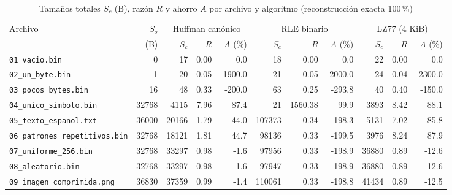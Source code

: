 \begin{table}[H]\centering\scriptsize
\caption{Tamaños totales $S_c$ (B), razón $R$ y ahorro $A$ por archivo y algoritmo (reconstrucción exacta 100\,\%)}\label{tab:tamanos}
\begin{tabular}{@{}lrrrrrrrrrr@{}}\toprule
Archivo & $S_o$ & \multicolumn{3}{c}{Huffman canónico} & \multicolumn{3}{c}{RLE binario} & \multicolumn{3}{c}{LZ77 (4 KiB)} \\
\cmidrule(lr){3-5}\cmidrule(lr){6-8}\cmidrule(l){9-11}
 & (B) & $S_c$ & $R$ & $A$ (\%) & $S_c$ & $R$ & $A$ (\%) & $S_c$ & $R$ & $A$ (\%) \\ \midrule
\texttt{01\_vacio.bin} & 0 & 17 & 0.00 & 0.0 & 18 & 0.00 & 0.0 & 22 & 0.00 & 0.0 \\
\texttt{02\_un\_byte.bin} & 1 & 20 & 0.05 & -1900.0 & 21 & 0.05 & -2000.0 & 24 & 0.04 & -2300.0 \\
\texttt{03\_pocos\_bytes.bin} & 16 & 48 & 0.33 & -200.0 & 63 & 0.25 & -293.8 & 40 & 0.40 & -150.0 \\
\texttt{04\_unico\_simbolo.bin} & 32768 & 4115 & 7.96 & 87.4 & 21 & 1560.38 & 99.9 & 3893 & 8.42 & 88.1 \\
\texttt{05\_texto\_espanol.txt} & 36000 & 20166 & 1.79 & 44.0 & 107373 & 0.34 & -198.3 & 5131 & 7.02 & 85.8 \\
\texttt{06\_patrones\_repetitivos.bin} & 32768 & 18121 & 1.81 & 44.7 & 98136 & 0.33 & -199.5 & 3976 & 8.24 & 87.9 \\
\texttt{07\_uniforme\_256.bin} & 32768 & 33297 & 0.98 & -1.6 & 97956 & 0.33 & -198.9 & 36880 & 0.89 & -12.6 \\
\texttt{08\_aleatorio.bin} & 32768 & 33297 & 0.98 & -1.6 & 97947 & 0.33 & -198.9 & 36880 & 0.89 & -12.6 \\
\texttt{09\_imagen\_comprimida.png} & 36830 & 37359 & 0.99 & -1.4 & 110061 & 0.33 & -198.8 & 41434 & 0.89 & -12.5 \\
\bottomrule\end{tabular}\end{table}
